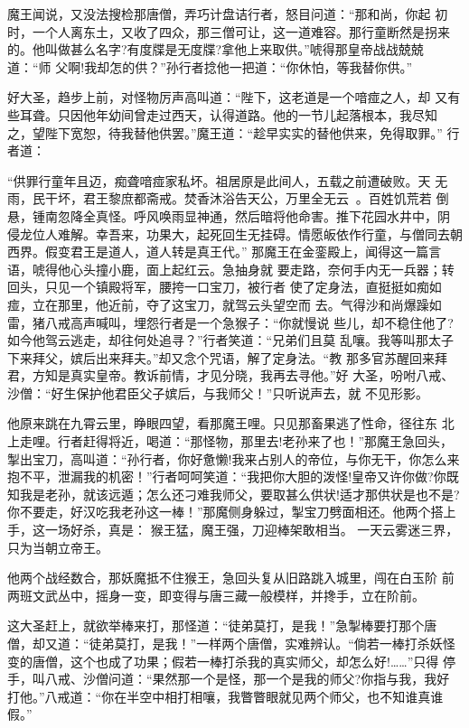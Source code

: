 魔王闻说，又没法搜检那唐僧，弄巧计盘诘行者，怒目问道：“那和尚，你起
初时，一个人离东土，又收了四众，那三僧可让，这一道难容。那行童断然是拐来
的。他叫做甚么名字?有度牒是无度牒?拿他上来取供。”唬得那皇帝战战兢兢道：“师
父啊!我却怎的供？”孙行者捻他一把道：“你休怕，等我替你供。”

好大圣，趋步上前，对怪物厉声高叫道：“陛下，这老道是一个喑痖之人，却
又有些耳聋。只因他年幼间曾走过西天，认得道路。他的一节儿起落根本，我尽知
之，望陛下宽恕，待我替他供罢。”魔王道：“趁早实实的替他供来，免得取罪。”
行者道：

“供罪行童年且迈，痴聋喑痖家私坏。祖居原是此间人，五载之前遭破败。天
无雨，民干坏，君王黎庶都斋戒。焚香沐浴告天公，万里全无云。百姓饥荒若
倒悬，锺南忽降全真怪。呼风唤雨显神通，然后暗将他命害。推下花园水井中，阴
侵龙位人难解。幸吾来，功果大，起死回生无挂碍。情愿皈依作行童，与僧同去朝
西界。假变君王是道人，道人转是真王代。”
那魔王在金銮殿上，闻得这一篇言语，唬得他心头撞小鹿，面上起红云。急抽身就
要走路，奈何手内无一兵器；转回头，只见一个镇殿将军，腰挎一口宝刀，被行者
使了定身法，直挺挺如痴如痖，立在那里，他近前，夺了这宝刀，就驾云头望空而
去。气得沙和尚爆躁如雷，猪八戒高声喊叫，埋怨行者是一个急猴子：“你就慢说
些儿，却不稳住他了?如今他驾云逃走，却往何处追寻？”行者笑道：“兄弟们且莫
乱嚷。我等叫那太子下来拜父，嫔后出来拜夫。”却又念个咒语，解了定身法。“教
那多官苏醒回来拜君，方知是真实皇帝。教诉前情，才见分晓，我再去寻他。”好
大圣，吩咐八戒、沙僧：“好生保护他君臣父子嫔后，与我师父！”只听说声去，就
不见形影。

他原来跳在九霄云里，睁眼四望，看那魔王哩。只见那畜果逃了性命，径往东
北上走哩。行者赶得将近，喝道：“那怪物，那里去!老孙来了也！”那魔王急回头，
掣出宝刀，高叫道：“孙行者，你好惫懒!我来占别人的帝位，与你无干，你怎么来
抱不平，泄漏我的机密！”行者呵呵笑道：“我把你大胆的泼怪!皇帝又许你做?你既
知我是老孙，就该远遁；怎么还刁难我师父，要取甚么供状!适才那供状是也不是?
你不要走，好汉吃我老孙这一棒！”那魔侧身躲过，掣宝刀劈面相还。他两个搭上
手，这一场好杀，真是：
猴王猛，魔王强，刀迎棒架敢相当。
一天云雾迷三界，只为当朝立帝王。

他两个战经数合，那妖魔抵不住猴王，急回头复从旧路跳入城里，闯在白玉阶
前两班文武丛中，摇身一变，即变得与唐三藏一般模样，并搀手，立在阶前。

这大圣赶上，就欲举棒来打，那怪道：“徒弟莫打，是我！”急掣棒要打那个唐
僧，却又道：“徒弟莫打，是我！”一样两个唐僧，实难辨认。“倘若一棒打杀妖怪
变的唐僧，这个也成了功果；假若一棒打杀我的真实师父，却怎么好!……”只得
停手，叫八戒、沙僧问道：“果然那一个是怪，那一个是我的师父?你指与我，我好
打他。”八戒道：“你在半空中相打相嚷，我瞥瞥眼就见两个师父，也不知谁真谁假。”

